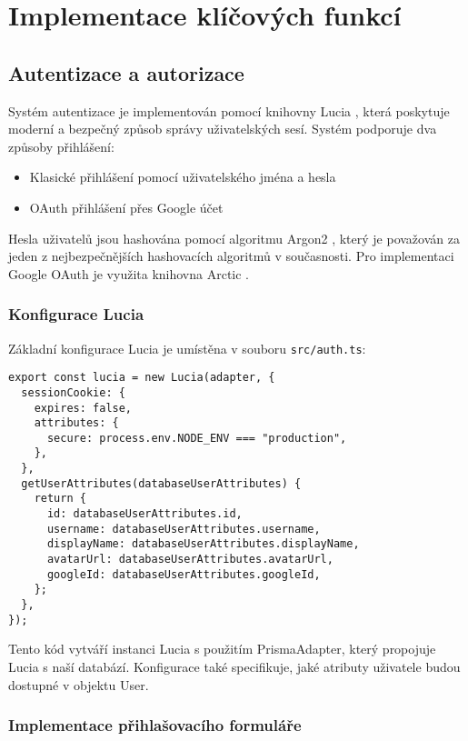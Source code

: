 \documentclass[12pt]{article}
\begin{document}
\newpage
\section{Implementace klíčových funkcí}

\subsection{Autentizace a autorizace}

Systém autentizace je implementován pomocí knihovny Lucia \citep{Lucia2023}, která poskytuje moderní a bezpečný způsob správy uživatelských sesí. Systém podporuje dva způsoby přihlášení:

\begin{itemize}
    \item Klasické přihlášení pomocí uživatelského jména a hesla
    \item OAuth přihlášení přes Google účet
\end{itemize}

Hesla uživatelů jsou hashována pomocí algoritmu Argon2 \citep{Argon2GitHub}, který je považován za jeden z nejbezpečnějších hashovacích algoritmů v současnosti. Pro implementaci Google OAuth je využita knihovna Arctic \citep{ArcticGitHub}.

\subsubsection{Konfigurace Lucia}

Základní konfigurace Lucia je umístěna v souboru \texttt{src/auth.ts}:

\begin{lstlisting}[style=typescript]
export const lucia = new Lucia(adapter, {
  sessionCookie: {
    expires: false,
    attributes: {
      secure: process.env.NODE_ENV === "production",
    },
  },
  getUserAttributes(databaseUserAttributes) {
    return {
      id: databaseUserAttributes.id,
      username: databaseUserAttributes.username,
      displayName: databaseUserAttributes.displayName,
      avatarUrl: databaseUserAttributes.avatarUrl,
      googleId: databaseUserAttributes.googleId,
    };
  },
});
\end{lstlisting}

Tento kód vytváří instanci Lucia s použitím PrismaAdapter, který propojuje Lucia s naší databází. Konfigurace také specifikuje, jaké atributy uživatele budou dostupné v objektu User.

\subsubsection{Implementace přihlašovacího formuláře}
\end{document}
